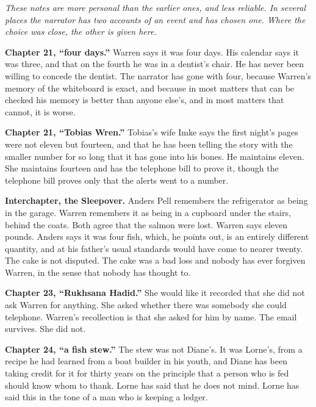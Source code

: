 

{\small

\emph{These notes are more personal than the earlier ones, and less reliable. In several places the narrator has two accounts of an event and has chosen one. Where the choice was close, the other is given here.}

\textbf{Chapter 21, ``four days.''} Warren says it was four days. His calendar says it was three, and that on the fourth he was in a dentist's chair. He has never been willing to concede the dentist. The narrator has gone with four, because Warren's memory of the whiteboard is exact, and because in most matters that can be checked his memory is better than anyone else's, and in most matters that cannot, it is worse.

\textbf{Chapter 21, ``Tobias Wren.''} Tobias's wife Imke says the first night's pages were not eleven but fourteen, and that he has been telling the story with the smaller number for so long that it has gone into his bones. He maintains eleven. She maintains fourteen and has the telephone bill to prove it, though the telephone bill proves only that the alerts went to a number.

\textbf{Interchapter, the Sleepover.} Anders Pell remembers the refrigerator as being in the garage. Warren remembers it as being in a cupboard under the stairs, behind the coats. Both agree that the salmon were lost. Warren says eleven pounds. Anders says it was four fish, which, he points out, is an entirely different quantity, and at his father's usual standards would have come to nearer twenty. The cake is not disputed. The cake was a bad loss and nobody has ever forgiven Warren, in the sense that nobody has thought to.

\textbf{Chapter 23, ``Rukhsana Hadid.''} She would like it recorded that she did not ask Warren for anything. She asked whether there was somebody she could telephone. Warren's recollection is that she asked for him by name. The email survives. She did not.

\textbf{Chapter 24, ``a fish stew.''} The stew was not Diane's. It was Lorne's, from a recipe he had learned from a boat builder in his youth, and Diane has been taking credit for it for thirty years on the principle that a person who is fed should know whom to thank. Lorne has said that he does not mind. Lorne has said this in the tone of a man who is keeping a ledger.

}
